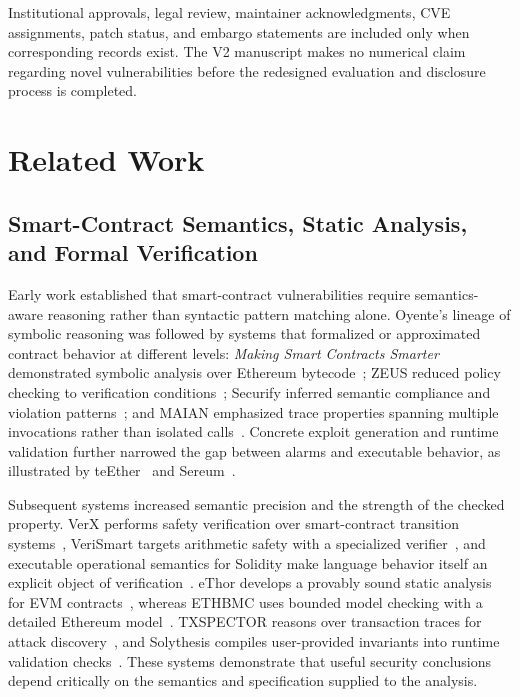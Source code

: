 \documentclass[journal]{IEEEtran}
\theoremstyle{definition}
\begin{document}
Institutional approvals, legal review, maintainer acknowledgments, CVE assignments, patch status, and embargo statements are included only when corresponding records exist. The V2 manuscript makes no numerical claim regarding novel vulnerabilities before the redesigned evaluation and disclosure process is completed.

\section{Related Work}
\label{sec:related}

\subsection{Smart-Contract Semantics, Static Analysis, and Formal Verification}

Early work established that smart-contract vulnerabilities require semantics-aware reasoning rather than syntactic pattern matching alone. Oyente's lineage of symbolic reasoning was followed by systems that formalized or approximated contract behavior at different levels: \emph{Making Smart Contracts Smarter} demonstrated symbolic analysis over Ethereum bytecode~\cite{luu2016making}; ZEUS reduced policy checking to verification conditions~\cite{kalra2018zeus}; Securify inferred semantic compliance and violation patterns~\cite{tsankov2018securify}; and MAIAN emphasized trace properties spanning multiple invocations rather than isolated calls~\cite{nikolic2018maian}. Concrete exploit generation and runtime validation further narrowed the gap between alarms and executable behavior, as illustrated by teEther~\cite{krupp2018teether} and Sereum~\cite{rodler2019sereum}.

Subsequent systems increased semantic precision and the strength of the checked property. VerX performs safety verification over smart-contract transition systems~\cite{permenev2020verx}, VeriSmart targets arithmetic safety with a specialized verifier~\cite{so2020verismart}, and executable operational semantics for Solidity make language behavior itself an explicit object of verification~\cite{jiao2020solidity}. eThor develops a provably sound static analysis for EVM contracts~\cite{schneidewind2020ethor}, whereas ETHBMC uses bounded model checking with a detailed Ethereum model~\cite{frank2020ethbmc}. TXSPECTOR reasons over transaction traces for attack discovery~\cite{zhang2020txspector}, and Solythesis compiles user-provided invariants into runtime validation checks~\cite{li2020solythesis}. These systems demonstrate that useful security conclusions depend critically on the semantics and specification supplied to the analysis.
\end{document}

